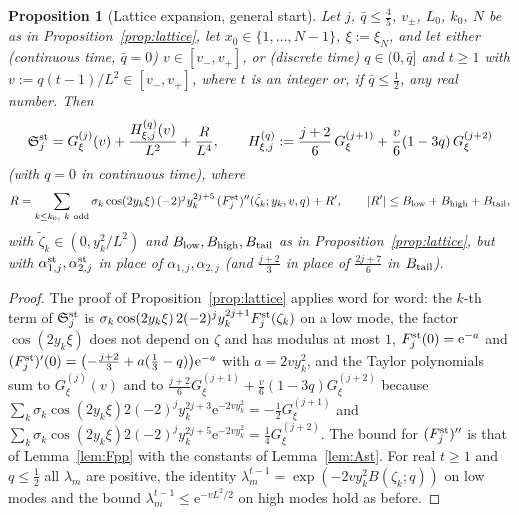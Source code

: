 \documentclass[11pt,a4paper]{article}
\newtheorem{proposition}[theorem]{Proposition}
\theoremstyle{definition}
\theoremstyle{remark}
\newcommand{\ee}{\mathrm{e}}
\begin{document}
\begin{proposition}[Lattice expansion, general start]\label{prop:latticest}
Let $j$, $\bar q\le\frac45$, $v_\pm$, $L_0$, $k_0$, $N$ be as in Proposition~\ref{prop:lattice}, let $x_0\in\{1,\dots,N-1\}$,
$\xi:=\xi_N$, and let either (continuous time, $\bar q=0$) $v\in[v_-,v_+]$, or (discrete time) $q\in(0,\bar q]$ and
$t\ge1$ with $v:=q(t-1)/L^2\in[v_-,v_+]$, where $t$ is an integer or, if $\bar q\le\frac12$, any real number. Then
\begin{equation}\label{eq:expansionst}
  \mathfrak S^{\rm st}_j=G_\xi^{(j)}(v)+\frac{H^{(q)}_{\xi,j}(v)}{L^2}+\frac R{L^4},\qquad
  H^{(q)}_{\xi,j}:=\frac{j+2}6\,G_\xi^{(j+1)}+\frac v6(1-3q)\,G_\xi^{(j+2)}
\end{equation}
(with $q=0$ in continuous time), where
\[
   R=\sum_{k\le k_0,\ k\ \rm odd}\sigma_k\cos(2y_k\xi)\,(-2)^jy_k^{2j+5}\,(F^{\rm st}_j)''(\tilde\zeta_k;y_k,v,q)+R',\qquad
   |R'|\le B_{\rm low}+B_{\rm high}+B_{\rm tail},
\]
with $\tilde\zeta_k\in(0,y_k^2/L^2)$ and $B_{\rm low},B_{\rm high},B_{\rm tail}$ as in Proposition~\ref{prop:lattice}, but with
$\alpha^{\rm st}_{1,j},\alpha^{\rm st}_{2,j}$ in place of $\alpha_{1,j},\alpha_{2,j}$ (and $\frac{j+2}3$ in place of
$\frac{2j+7}6$ in $B_{\rm tail}$).
\end{proposition}
\begin{proof}
The proof of Proposition~\ref{prop:lattice} applies word for word: the $k$-th term of $\mathfrak S^{\rm st}_j$ is
$\sigma_k\cos(2y_k\xi)\,2(-2)^jy_k^{2j+1}F^{\rm st}_j(\zeta_k)$ on a low mode, the factor $\cos(2y_k\xi)$ does not depend on
$\zeta$ and has modulus at most $1$, $F^{\rm st}_j(0)=\ee^{-a}$ and
$(F^{\rm st}_j)'(0)=\bigl(-\frac{j+2}3+a(\frac13-q)\bigr)\ee^{-a}$ with $a=2vy_k^2$, and the Taylor polynomials sum to
$G_\xi^{(j)}(v)$ and to $\frac{j+2}6G_\xi^{(j+1)}+\frac v6(1-3q)G_\xi^{(j+2)}$ because
$\sum_k\sigma_k\cos(2y_k\xi)2(-2)^jy_k^{2j+3}\ee^{-2vy_k^2}=-\frac12G_\xi^{(j+1)}$ and
$\sum_k\sigma_k\cos(2y_k\xi)2(-2)^jy_k^{2j+5}\ee^{-2vy_k^2}=\frac14G_\xi^{(j+2)}$. The bound for $(F^{\rm st}_j)''$ is that of
Lemma~\ref{lem:Fpp} with the constants of Lemma~\ref{lem:Ast}. For real $t\ge1$ and $q\le\frac12$ all $\lambda_m$ are
positive, the identity $\lambda_m^{t-1}=\exp(-2vy_k^2B(\zeta_k;q))$ on low modes and the bound
$\lambda_m^{t-1}\le\ee^{-vL^2/2}$ on high modes hold as before.
\end{proof}
\end{document}
